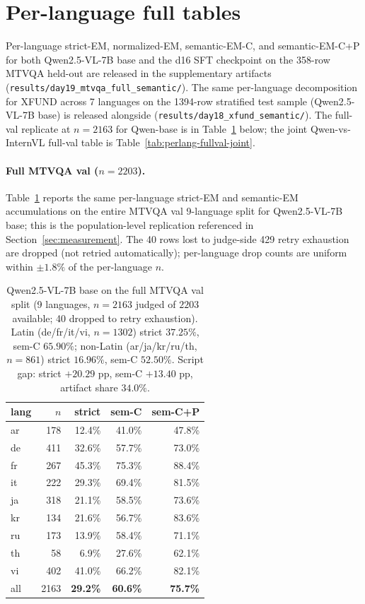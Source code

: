 \section{Per-language full tables}
\label{app:per-language}

Per-language strict-EM, normalized-EM, semantic-EM-C, and semantic-EM-C+P for both Qwen2.5-VL-7B base and the d16 SFT checkpoint on the 358-row MTVQA held-out are released in the supplementary artifacts (\texttt{results/day19\_mtvqa\_full\_semantic/}). The same per-language decomposition for XFUND across 7 languages on the 1394-row stratified test sample (Qwen2.5-VL-7B base) is released alongside (\texttt{results/day18\_xfund\_semantic/}). The full-val replicate at $n=2163$ for Qwen-base is in Table~\ref{tab:perlang-fullval-mtvqa} below; the joint Qwen-vs-InternVL full-val table is Table~\ref{tab:perlang-fullval-joint}.

\paragraph{Full MTVQA val ($n=2203$).}
Table~\ref{tab:perlang-fullval-mtvqa} reports the same per-language strict-EM and semantic-EM accumulations on the entire MTVQA val 9-language split for Qwen2.5-VL-7B base; this is the population-level replication referenced in Section~\ref{sec:measurement}. The 40 rows lost to judge-side 429 retry exhaustion are dropped (not retried automatically); per-language drop counts are uniform within $\pm 1.8\%$ of the per-language $n$.

\begin{table}[t]
\centering
\small
\begin{tabular}{lrrrr}
\toprule
lang & $n$ & strict & sem-C & sem-C+P \\
\midrule
ar & 178 & 12.4\% & 41.0\% & 47.8\% \\
de & 411 & 32.6\% & 57.7\% & 73.0\% \\
fr & 267 & 45.3\% & 75.3\% & 88.4\% \\
it & 222 & 29.3\% & 69.4\% & 81.5\% \\
ja & 318 & 21.1\% & 58.5\% & 73.6\% \\
kr & 134 & 21.6\% & 56.7\% & 83.6\% \\
ru & 173 & 13.9\% & 58.4\% & 71.1\% \\
th &  58 & 6.9\%  & 27.6\% & 62.1\% \\
vi & 402 & 41.0\% & 66.2\% & 82.1\% \\
\midrule
all & 2163 & \textbf{29.2\%} & \textbf{60.6\%} & \textbf{75.7\%} \\
\bottomrule
\end{tabular}
\caption{Qwen2.5-VL-7B base on the full MTVQA val split (9 languages, $n=2163$ judged of $2203$ available; 40 dropped to retry exhaustion). Latin (de/fr/it/vi, $n=1302$) strict $37.25\%$, sem-C $65.90\%$; non-Latin (ar/ja/kr/ru/th, $n=861$) strict $16.96\%$, sem-C $52.50\%$. Script gap: strict $+20.29$ pp, sem-C $+13.40$ pp, artifact share $34.0\%$.}
\label{tab:perlang-fullval-mtvqa}
\end{table}

